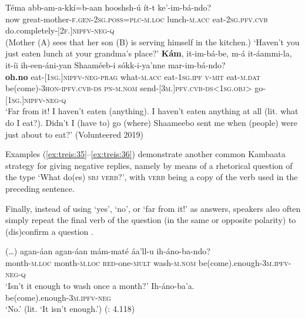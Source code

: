 \documentclass[output=paper,colorlinks,citecolor=brown,draftmode
]{langscibook}
\begin{document}
\ea\label{ex:treis:36} 
    \begin{xlist}[B: ]
        \gll  Téma abb-am-a-kkí=b-aan hooshsh-ú ít-t ke’-im-bá-ndo? \\
            now 	great-mother-\textsc{f.gen-2sg.poss=plc-m.loc} lunch-\textsc{m.acc} eat-\textsc{2sg.pfv.cvb} do.completely-\textsc{[2f.]nipfv-neg-q}\\
        \glt (Mother (A) sees that her son (B) is serving himself in the kitchen.) ‘Haven’t you just eaten lunch at your grandma’s place?’
        \gll  \textbf{Kám},	it-im-bá-be, m-á				it-áammi-la, it-íi ih-een-áni-yan Shaaméeb-i sókk-i-ya’nne  mar-im-bá-ndo?\\
        \textbf{oh.no}	eat-\textsc{[1sg.]nipfv-neg-prag} what-\textsc{m.acc}	eat-\textsc{1sg.ipf v-mit}	eat-\textsc{m.dat}	be(come)-\textsc{3hon-ipfv.cvb-ds} \textsc{pn-m.nom}	send-\textsc{[3m.]pfv.cvb-ds<1sg.obj>}	go-\textsc{[1sg.]nipfv-neg-q}\\
        \glt ‘Far from it! I haven't eaten (anything). I haven't eaten anything at all (lit. what do I eat?). Didn’t I (have to) go (where) Shaameebo sent me when (people) were just about to eat?’ (Volunteered 2019)
    \end{xlist}
\z 

Examples (\ref{ex:treis:35}--\ref{ex:treis:36}) demonstrate another common Kambaata strategy for giving negative replies, namely by means of a rhetorical question of the type ‘What do(es) \textsc{sbj verb}?’, with \textsc{verb} being a copy of the verb used in the preceding sentence. 

Finally, instead of using ‘yes’, ‘no’, or ‘far from it!’ as answers, speakers also often simply repeat the final verb of the question (in the same or opposite polarity) to (dis)confirm a question .

\ea\label{ex:treis:37} 
    \begin{xlist}[B: ]
        \gll (…)	agan-áan		agan-áan		mám-maté			áa’ll-u ih-áno-ba-ndo?		 \\ 
             {} month-\textsc{m.loc}	month-\textsc{m.loc}	\textsc{red}-one-\textsc{mult}	wash-\textsc{m.nom} be(come).enough-\textsc{3m.ipfv-neg-q} \\ 
        \glt ‘Isn’t it enough to wash once a month?’
        \gll Ih-áno-ba’a. \\ 
             be(come).enough-\textsc{3m.ipfv-neg}  \\
        \glt ‘No.’ (lit. ‘It isn’t enough.’) (\cite{KEB1989}{:} 4.118)
    \end{xlist}
\z 
\end{document}
